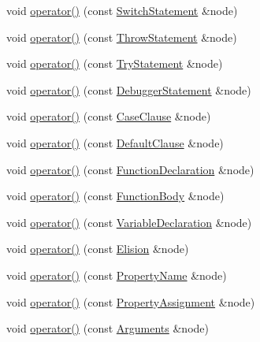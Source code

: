 \begin{DoxyCompactItemize}
\item 
void \hyperlink{struct_delegate_vistor_ad35c29053e1e55df4fdfec753e2af65c}{operator()} (const \hyperlink{struct_switch_statement}{Switch\+Statement} \&node)
\item 
void \hyperlink{struct_delegate_vistor_ad63c1d6ae6eb56b90f2220cecbb5b051}{operator()} (const \hyperlink{struct_throw_statement}{Throw\+Statement} \&node)
\item 
void \hyperlink{struct_delegate_vistor_a33703e629ed7a3455dec06328bcf96b3}{operator()} (const \hyperlink{struct_try_statement}{Try\+Statement} \&node)
\item 
void \hyperlink{struct_delegate_vistor_a4e5266c7afa92d8ab3a3044012b5e759}{operator()} (const \hyperlink{struct_debugger_statement}{Debugger\+Statement} \&node)
\item 
void \hyperlink{struct_delegate_vistor_a1d0269af22e62f02bdb034cacab3943e}{operator()} (const \hyperlink{struct_case_clause}{Case\+Clause} \&node)
\item 
void \hyperlink{struct_delegate_vistor_a24f155abe5d7beea2d9590e8f2ff1d92}{operator()} (const \hyperlink{struct_default_clause}{Default\+Clause} \&node)
\item 
void \hyperlink{struct_delegate_vistor_af0cb6068a5003270dd6fa5c2884176a3}{operator()} (const \hyperlink{struct_function_declaration}{Function\+Declaration} \&node)
\item 
void \hyperlink{struct_delegate_vistor_a01b340b6e6d3e226921d08201110c630}{operator()} (const \hyperlink{struct_function_body}{Function\+Body} \&node)
\item 
void \hyperlink{struct_delegate_vistor_a640eb6901b93928ff1383f590e9f2e38}{operator()} (const \hyperlink{struct_variable_declaration}{Variable\+Declaration} \&node)
\item 
void \hyperlink{struct_delegate_vistor_a05c79010b017e24baf16418b702166c0}{operator()} (const \hyperlink{struct_elision}{Elision} \&node)
\item 
void \hyperlink{struct_delegate_vistor_a2095c8d660bf137ee96d9804b94f720e}{operator()} (const \hyperlink{struct_property_name}{Property\+Name} \&node)
\item 
void \hyperlink{struct_delegate_vistor_af40388bfd6122c6a975fb55f5b07b59b}{operator()} (const \hyperlink{struct_property_assignment}{Property\+Assignment} \&node)
\item 
void \hyperlink{struct_delegate_vistor_adc76c1e9388701dd55062dfb0b7f8602}{operator()} (const \hyperlink{struct_arguments}{Arguments} \&node)
\item 

\end{DoxyCompactItemize}
